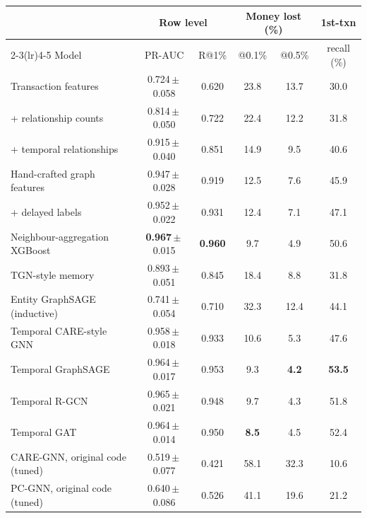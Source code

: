 \begin{tabular}{@{}lccccc@{}}
\toprule
 & \multicolumn{2}{c}{Row level} & \multicolumn{2}{c}{Money lost (\%)} & 1st-txn \\
\cmidrule(lr){2-3}\cmidrule(lr){4-5}
Model & PR-AUC & R@1\% & @0.1\% & @0.5\% & recall (\%) \\
\midrule
Transaction features & 0.724\,$\pm$\,0.058 & 0.620 & 23.8 & 13.7 & 30.0 \\
\quad + relationship counts & 0.814\,$\pm$\,0.050 & 0.722 & 22.4 & 12.2 & 31.8 \\
\quad + temporal relationships & 0.915\,$\pm$\,0.040 & 0.851 & 14.9 & 9.5 & 40.6 \\
Hand-crafted graph features & 0.947\,$\pm$\,0.028 & 0.919 & 12.5 & 7.6 & 45.9 \\
\quad + delayed labels & 0.952\,$\pm$\,0.022 & 0.931 & 12.4 & 7.1 & 47.1 \\
\midrule
Neighbour-aggregation XGBoost & \textbf{0.967}\,$\pm$\,0.015 & \textbf{0.960} & 9.7 & 4.9 & 50.6 \\
\midrule
TGN-style memory & 0.893\,$\pm$\,0.051 & 0.845 & 18.4 & 8.8 & 31.8 \\
Entity GraphSAGE (inductive) & 0.741\,$\pm$\,0.054 & 0.710 & 32.3 & 12.4 & 44.1 \\
Temporal CARE-style GNN & 0.958\,$\pm$\,0.018 & 0.933 & 10.6 & 5.3 & 47.6 \\
Temporal GraphSAGE & 0.964\,$\pm$\,0.017 & 0.953 & 9.3 & \textbf{4.2} & \textbf{53.5} \\
Temporal R-GCN & 0.965\,$\pm$\,0.021 & 0.948 & 9.7 & 4.3 & 51.8 \\
Temporal GAT & 0.964\,$\pm$\,0.014 & 0.950 & \textbf{8.5} & 4.5 & 52.4 \\
\midrule
CARE-GNN, original code (tuned) & 0.519\,$\pm$\,0.077 & 0.421 & 58.1 & 32.3 & 10.6 \\
PC-GNN, original code (tuned) & 0.640\,$\pm$\,0.086 & 0.526 & 41.1 & 19.6 & 21.2 \\
\bottomrule
\end{tabular}

